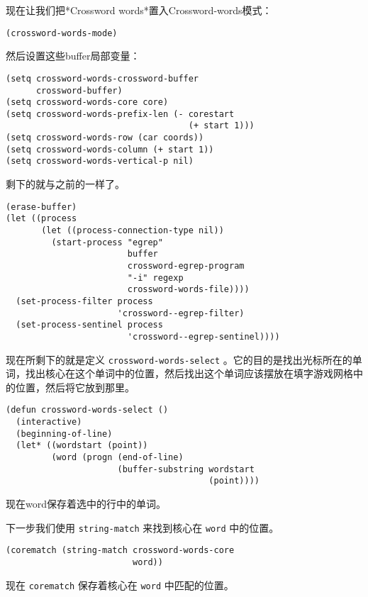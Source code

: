 现在让我们把*Crossword words*置入Crossword-words模式：

\begin{verbatim}
(crossword-words-mode)
\end{verbatim}

然后设置这些buffer局部变量：

\begin{verbatim}
(setq crossword-words-crossword-buffer
      crossword-buffer)
(setq crossword-words-core core)
(setq crossword-words-prefix-len (- corestart
                                    (+ start 1)))
(setq crossword-words-row (car coords))
(setq crossword-words-column (+ start 1))
(setq crossword-words-vertical-p nil)
\end{verbatim}

剩下的就与之前的一样了。

\begin{verbatim}
(erase-buffer)
(let ((process
       (let ((process-connection-type nil))
         (start-process "egrep"
                        buffer
                        crossword-egrep-program
                        "-i" regexp
                        crossword-words-file))))
  (set-process-filter process
                      'crossword--egrep-filter)
  (set-process-sentinel process
                        'crossword--egrep-sentinel))))
\end{verbatim}

现在所剩下的就是定义 \texttt{crossword-words-select} 。它的目的是找出光标所在的单词，找出核心在这个单词中的位置，然后找出这个单词应该摆放在填字游戏网格中的位置，然后将它放到那里。

\begin{verbatim}
(defun crossword-words-select ()
  (interactive)
  (beginning-of-line)
  (let* ((wordstart (point))
         (word (progn (end-of-line)
                      (buffer-substring wordstart
                                        (point))))
\end{verbatim}

现在word保存着选中的行中的单词。

下一步我们使用 \texttt{string-match} 来找到核心在 \texttt{word} 中的位置。

\begin{verbatim}
(corematch (string-match crossword-words-core
                         word))
\end{verbatim}

现在 \texttt{corematch} 保存着核心在 \texttt{word} 中匹配的位置。

